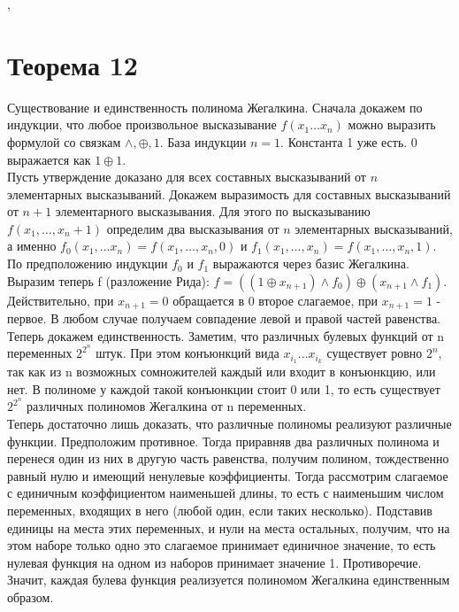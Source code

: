 \documentclass[a4paper,12pt]{article}
\newcommand*\xor{\mathbin{\oplus}}
\begin{document}
    \sep
    \section{Теорема 12}
    Существование и единственность полинома Жегалкина.
    Сначала докажем по индукции, что любое произвольное высказывание $f(x_1 \ldots x_n)$
    можно выразить формулой со связкам $\wedge, \xor, 1$. База индукции $n = 1$.
    Константа 1 уже есть. 0 выражается как $1 \xor 1$. \\
    Пусть утверждение доказано для всех составных высказываний от $n$ элементарных
    высказываний. Докажем выразимость для составных высказываний от $n + 1$ элементарного
    высказывания. Для этого по высказыванию $f(x_1, \ldots , x_n+1)$ определим
    два высказывания от $n$ элементарных высказываний, а именно $f_0(x_1, \ldots x_n) =
    f(x_1, \ldots , x_n, 0) $ и $f_1(x_1, \ldots , x_n) = f(x_1, \ldots , x_n, 1)$.
    По предположению индукции $f_0$ и $f_1$ выражаются через базис Жегалкина. Выразим
    теперь f (разложение Рида): $f = ((1 \xor x_{n+1}) \wedge f_0) \xor (x_{n+1} \wedge f_1)$.
    Действительно, при $x_{n+1} = 0$ обращается в 0 второе слагаемое, при $x_{n+1} = 1$ -
    первое. В любом случае получаем совпадение левой и правой частей равенства.
    \\
    Теперь докажем единственность.
    Заметим, что различных булевых функций от n переменных $2^{2^n}$ штук.
    При этом конъюнкций вида $x_{i_1} \ldots x_{i_k}$ существует ровно $2^n$, так как из
    n возможных сомножителей каждый или входит в конъюнкцию, или нет. В полиноме у
    каждой такой конъюнкции стоит 0 или 1, то есть существует $2^{2^n}$ различных
    полиномов Жегалкина от n переменных.\\
    Теперь достаточно лишь доказать, что различные полиномы реализуют различные функции.
    Предположим противное. Тогда приравняв два различных полинома и перенеся один из них
    в другую часть равенства, получим полином, тождественно равный нулю и имеющий ненулевые
    коэффициенты. Тогда рассмотрим слагаемое с единичным коэффициентом наименьшей длины,
    то есть с наименьшим числом переменных, входящих в него (любой один, если таких несколько).
    Подставив единицы на места этих переменных, и нули на места остальных, получим,
    что на этом наборе только одно это слагаемое принимает единичное значение, то
    есть нулевая функция на одном из наборов принимает значение 1. Противоречие.
    Значит, каждая булева функция реализуется полиномом Жегалкина единственным образом.
\end{document}

